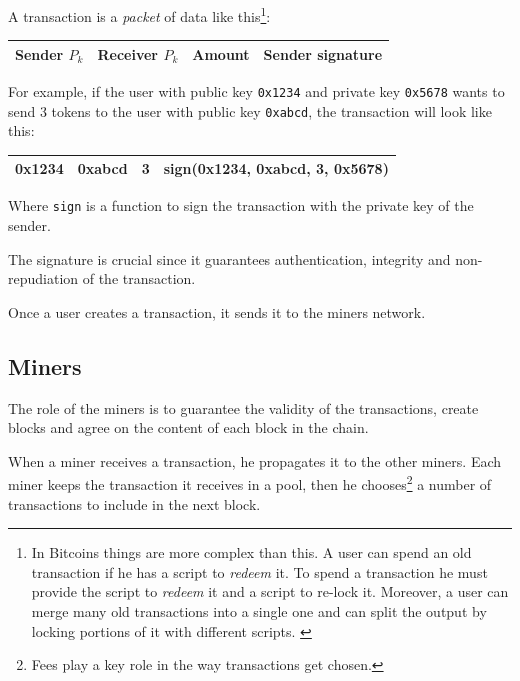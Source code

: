 \documentclass[12pt]{article}
\begin{document}
A transaction is a \textit{packet} of data like this\footnote{In Bitcoins things are more complex than this. A user can spend an old transaction if he has a script to \textit{redeem} it. To spend a transaction he must provide the script to \textit{redeem} it and a script to re-lock it. Moreover, a user can merge many old transactions into a single one and can split the output by locking portions of it with different scripts. \cite{bitcoin_transactions}}:
\begin{table}[ht]
    \centering
    \begin{tabular}{|c|c|c|c|}
        \hline
        Sender \(P_k\) & Receiver \(P_k\) & Amount & Sender signature \\
        \hline
    \end{tabular}
    \label{table:transaction}
\end{table}

For example, if the user with public key \verb|0x1234| and private key \verb|0x5678| wants to send 3 tokens to the user with public key \verb|0xabcd|, the transaction will look like this:
\begin{table}[ht]
    \centering
    \begin{tabular}{|c|c|c|c|}
        \hline
        0x1234 & 0xabcd & 3 & sign(0x1234, 0xabcd, 3, 0x5678) \\
        \hline
    \end{tabular}
    \label{table:transactionExample}
\end{table}

Where \verb|sign| is a function to sign the transaction with the private key of the sender.

The signature is crucial since it guarantees authentication, integrity and non-repudiation of the transaction.

Once a user creates a transaction, it sends it to the miners network.

\subsection{Miners} \label{subsection:miners}
The role of the miners is to guarantee the validity of the transactions, create blocks and agree on the content of each block in the chain.

When a miner receives a transaction, he propagates it to the other miners. Each miner keeps the transaction it receives in a pool, then he chooses\footnote{Fees \cite{bitcoin_fees} play a key role in the way transactions get chosen.} a number of transactions to include in the next block.
\end{document}
